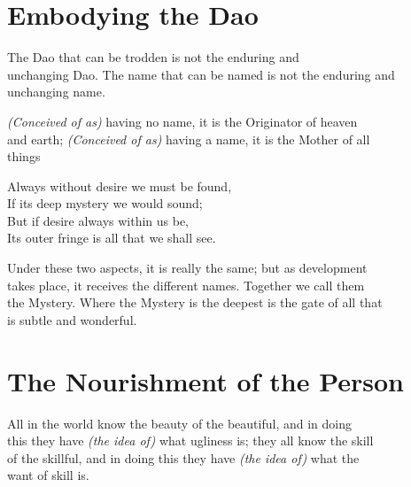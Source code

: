 \centering
\section*{Embodying the Dao}
    
    The Dao that can be trodden is not the enduring and \\
    unchanging Dao. The name that can be named is not the enduring and\\
    unchanging name.\vspace*{\baselineskip}
    
    \textit{(Conceived of as)} having no name, it is the Originator of heaven\\
    and earth; \textit{(Conceived of as)} having a name, it is the Mother of all\\
    things\vspace*{\baselineskip}
    
    Always without desire we must be found,\\
    If its deep mystery we would sound;\\
    But if desire always within us be,\\
    Its outer fringe is all that we shall see.\vspace{\baselineskip}

    Under these two aspects, it is really the same; but as development\\
    takes place, it receives the different names. Together we call them\\
    the Mystery. Where the Mystery is the deepest is the gate of all that\\
    is subtle and wonderful.\\
    
\section*{The Nourishment of the Person}
    All in the world know the beauty of the beautiful, and in doing\\
    this they have \textit{(the idea of)} what ugliness is; they all know the skill\\
    of the skillful, and in doing this they have \textit{(the idea of)} what the\\
    want of skill is.\vspace{\baselineskip}
    
